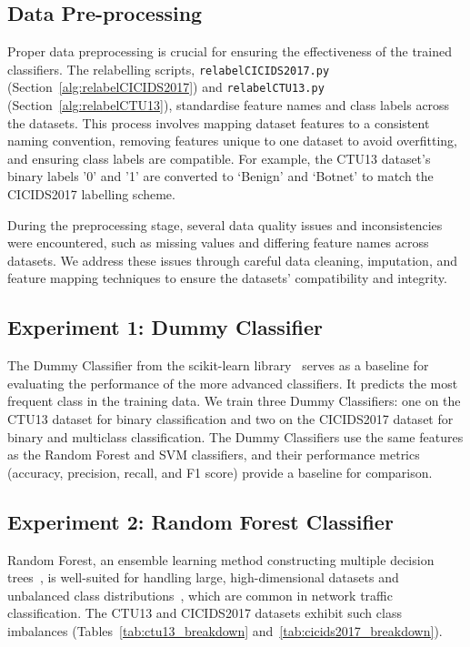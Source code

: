 \subsection{Data Pre-processing}\label{subsec:pre-processing}
Proper data preprocessing is crucial for ensuring the effectiveness of the trained classifiers. The relabelling scripts, \texttt{relabelCICIDS2017.py} (Section~\ref{alg:relabelCICIDS2017}) and \texttt{relabelCTU13.py} (Section~\ref{alg:relabelCTU13}), standardise feature names and class labels across the datasets. This process involves mapping dataset features to a consistent naming convention, removing features unique to one dataset to avoid overfitting, and ensuring class labels are compatible. For example, the CTU13 dataset's binary labels '0' and '1' are converted to `Benign' and `Botnet' to match the CICIDS2017 labelling scheme.

During the preprocessing stage, several data quality issues and inconsistencies were encountered, such as missing values and differing feature names across datasets. We address these issues through careful data cleaning, imputation, and feature mapping techniques to ensure the datasets' compatibility and integrity.

\subsection{Experiment 1: Dummy Classifier}\label{subsec:baseline-performance}
The Dummy Classifier from the scikit-learn library~\cite{pedregosa2011scikit} serves as a baseline for evaluating the performance of the more advanced classifiers. It predicts the most frequent class in the training data. We train three Dummy Classifiers: one on the CTU13 dataset for binary classification and two on the CICIDS2017 dataset for binary and multiclass classification. The Dummy Classifiers use the same features as the Random Forest and SVM classifiers, and their performance metrics (accuracy, precision, recall, and F1 score) provide a baseline for comparison.

\subsection{Experiment 2: Random Forest Classifier}\label{subsec:random-forest-classifier}
Random Forest, an ensemble learning method constructing multiple decision trees~\cite{hastie2009random}, is well-suited for handling large, high-dimensional datasets and unbalanced class distributions~\cite{farnaaz2016random}, which are common in network traffic classification. The CTU13 and CICIDS2017 datasets exhibit such class imbalances (Tables~\ref{tab:ctu13_breakdown} and~\ref{tab:cicids2017_breakdown}).

